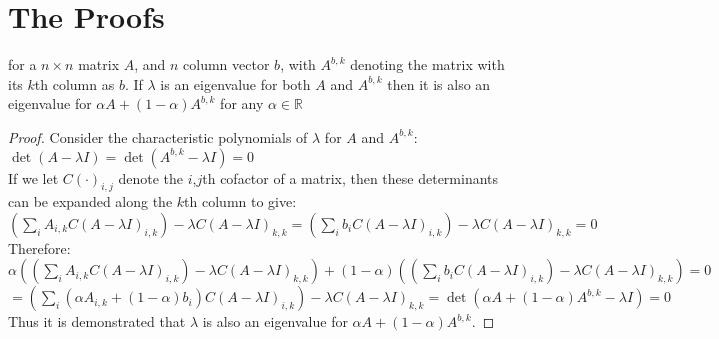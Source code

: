 \section{The Proofs}\label{appendix5b}



\begin{Lemma}\label{lem2}
for a $n\times n$ matrix $A$, and $n$ column vector $b$, with $A^{b,k}$ denoting the matrix with its $k$th column as $b$.
If $\lambda$ is an eigenvalue for both $A$ and $A^{b,k}$ then it is also an eigenvalue for $\alpha A + (1-\alpha)A^{b,k}$ for any $\alpha \in \mathbb{R}$
\end{Lemma}
\begin{proof}
Consider the characteristic polynomials of $\lambda$ for $A$ and $A^{b,k}$:\\
$\det(A-\lambda I)=\det(A^{b,k}-\lambda I)=0$\\
If we let $C(\cdot)_{i,j}$ denote the $i$,$j$th cofactor of a matrix, then these determinants can be expanded along the $k$th column to give:\\
$\left(\sum_iA_{i,k}C(A-\lambda I)_{i,k}\right)-\lambda C(A-\lambda I)_{k,k}=\left(\sum_ib_iC(A-\lambda I)_{i,k}\right)-\lambda C(A-\lambda I)_{k,k}=0$\\
Therefore:\\
$\alpha\left(\left(\sum_iA_{i,k}C(A-\lambda I)_{i,k}\right)-\lambda C(A-\lambda I)_{k,k}\right) + (1-\alpha)\left(\left(\sum_ib_iC(A-\lambda I)_{i,k}\right)-\lambda C(A-\lambda I)_{k,k}\right)=0$\\
$=\left(\sum_i(\alpha A_{i,k}+(1-\alpha)b_i)C(A-\lambda I)_{i,k}\right)-\lambda C(A-\lambda I)_{k,k} =\det(\alpha A + (1-\alpha)A^{b,k}-\lambda I)=0$\\
Thus it is demonstrated that $\lambda$ is also an eigenvalue for $\alpha A + (1-\alpha)A^{b,k}$.
\end{proof}

